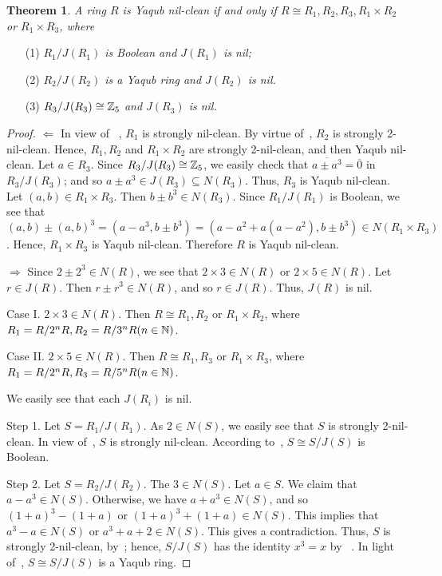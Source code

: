 \documentclass[12pt, reqno]{amsart}
\newtheorem{thm}{Theorem}[section]
\numberwithin{equation}{section}
\begin{document}
\begin{thm} A ring $R$ is Yaqub nil-clean if and only if $R\cong R_1, R_2,R_3,R_1\times R_2$ or $R_1\times R_3$, where
\end{thm}
\begin{enumerate}
\item [(1)] {\it $R_1/J(R_1)$ is Boolean and $J(R_1)$ is nil;}
\vspace{-.5mm}
\item [(2)] {\it $R_2/J(R_2)$ is a Yaqub ring and $J(R_2)$ is nil.}
\vspace{-.5mm}
\item [(3)] {\it $R_3/J(R_3)\cong {\Bbb Z}_5$ and $J(R_3)$ is nil.}
\end{enumerate}
\begin{proof} $\Longleftarrow $ In view of ~\cite[Theorem 2.7]{KWZ}, $R_1$ is strongly nil-clean. By virtue of~\cite[Theorem 4.2]{CS}, $R_2$ is strongly 2-nil-clean.
Hence, $R_1,R_2$ and $R_1\times R_2$ are strongly 2-nil-clean, and then Yaqub nil-clean. Let $a\in R_3$. Since $R_3/J(R_3)\cong {\Bbb Z}_5$, we easily check that $\overline{a\pm a^3}=\overline{0}$ in $R_3/J(R_3)$; and so $a\pm a^3\in J(R_3)\subseteq N(R_3)$. Thus, $R_3$ is Yaqub nil-clean.
Let $(a,b)\in R_1\times R_3$. Then $b\pm b^3\in N(R_3)$.
Since $R_1/J(R_1)$ is Boolean, we see that $(a,b)\pm (a,b)^3=(a-a^3,b\pm b^3)=(a-a^2+a(a-a^2),b\pm b^3)\in N(R_1\times R_3)$. Hence, $R_1\times R_3$ is Yaqub nil-clean. Therefore $R$ is Yaqub nil-clean.

$\Longrightarrow$ Since $2\pm 2^3\in N(R)$, we see that $2\times 3\in N(R)$ or $2\times 5\in N(R)$. Let $r\in J(R)$. Then $r\pm r^3\in N(R)$, and so $r\in J(R)$. Thus, $J(R)$ is nil.

Case I. $2\times 3\in N(R)$. Then $R\cong R_1,R_2$ or $R_1\times R_2$, where $R_1=R/2^nR,R_2=R/3^nR (n\in {\Bbb N})$.

Case II. $2\times 5\in N(R)$. Then $R\cong R_1,R_3$ or $R_1\times R_3$, where $R_1=R/2^nR,R_3=R/5^nR (n\in {\Bbb N})$.

We easily see that each $J(R_i)$ is nil.

Step 1. Let $S=R_1/J(R_1)$. As $2\in N(S)$, we easily see that $S$ is strongly 2-nil-clean. In view of~\cite[Theorem 2.11]{CS}, $S$ is strongly nil-clean.
According to~\cite[Theorem 2.7]{KWZ}, $S\cong S/J(S)$ is Boolean.

Step 2. Let $S=R_2/J(R_2)$. The $3\in N(S)$. Let $a\in S$. We claim that $a-a^3\in N(S)$. Otherwise, we have $a+a^3\in N(S)$, and so $(1+a)^3-(1+a)$ or $(1+a)^3+(1+a)\in N(S)$. This implies that $a^3-a\in N(S)$ or $a^3+a+2\in N(S)$. This gives a contradiction. Thus, $S$ is strongly 2-nil-clean, by~\cite[Theorem 2.3]{CS}; hence, $S/J(S)$ has the identity $x^3=x$ by ~\cite[Theorem 3.3]{CS}. In light of~\cite[Lemma 4.4]{CS}, $S\cong S/J(S)$ is a Yaqub ring.


\end{proof}
\end{document}
